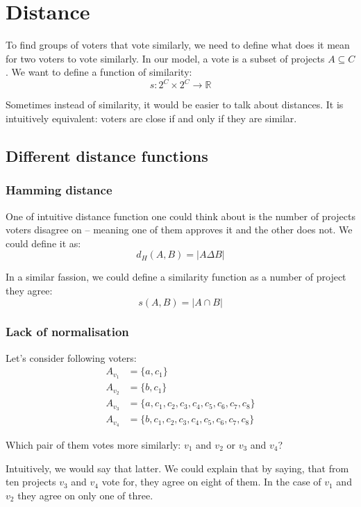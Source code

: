 \documentclass{article}
\begin{document}
\section{Distance}

To find groups of voters that vote similarly, we need to define what does it
mean for two voters to vote similarly. In our model, a vote is a subset of
projects $A \subseteq C$. We want to define a function of similarity:
\[ s : 2^C \times 2^C \to \mathbb{R} \]

Sometimes instead of similarity, it would be easier to talk about distances. It
is intuitively equivalent: voters are close if and only if they are similar.

\subsection{Different distance functions}

\subsubsection{Hamming distance}

One of intuitive distance function one could think about is the number of
projects voters disagree on -- meaning one of them approves it and the other
does not. We could define it as:
\[ d_H(A,B) = |A \Delta B| \]

In a similar fassion, we could define a similarity function as a number of
project they agree:
\[ s(A,B) = |A \cap B| \]

\subsubsection*{Lack of normalisation}

Let's consider following voters:
\begin{align*}
  A_{v_1} &= \{ a, c_1 \} \\
  A_{v_2} &= \{ b, c_1 \} \\
  A_{v_3} &= \{ a, c_1, c_2, c_3, c_4, c_5, c_6, c_7, c_8 \} \\
  A_{v_4} &= \{ b, c_1, c_2, c_3, c_4, c_5, c_6, c_7, c_8 \}
\end{align*}

Which pair of them votes more similarly: $v_1$ and $v_2$ or $v_3$ and $v_4$?

Intuitively, we would say that latter. We could explain that by saying, that
from ten projects $v_3$ and $v_4$ vote for, they agree on eight of them. In the
case of $v_1$ and $v_2$ they agree on only one of three.
\end{document}
